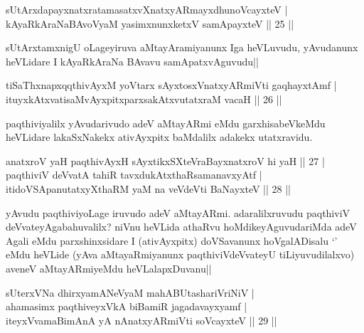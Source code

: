 
\begin{shl}
sUtArxdapayxnatxratamasatxvXnatxyARmayxdhunoVcayxteV |\\
kAyaRkAraNaBAvoV\s yaM yasimxnunxketxV samApayxteV \hfill || 25 ||
\end{shl}

\begin{artha}
sUtArxtamxnigU oLageyiruva aMtayAramiyanunx Iga heVLuvudu, yAvudanunx heVLidare I kAyaRkAraNa BAvavu samApatxvAguvudu||
\end{artha}


\begin{shl}
tiSaThxnapxqqthivAyxM yoV\s tarx sAyxtosxV\s natxyARmiVti  gaqhayxtAmf |\\
ituyxkAtxvatisaMvAyxpitxparxsakAtxvutatxraM vacaH \hfill || 26 ||
\end{shl}

\begin{artha}
paqthiviyalilx yAvudarivudo adeV aMtayARmi eMdu garxhisabeVkeMdu heVLidare lakaSxNakekx ativAyxpitx baMdalilx adakekx utatxravidu.
\end{artha}


\begin{shl}
anatxroV yaH paqthivAyxH sAyxtikxSXteVraBayxnatxroV hi yaH \hfill || 27 |\\
paqthiviV deVvatA tahiR tavxdukAtxthaRsamanavxyAtf |\\
itidoVSApanutatxyXthaRM yaM na veVdeVti BaNayxteV \hfill || 28 ||
\end{shl}

\begin{artha}
yAvudu paqthiviyoLage iruvudo adeV aMtayARmi. adaralilxruvudu paqthiviV deVvateyAgabahuvalilx? niVnu heVLida athaRvu hoMdikeyAguvudariMda adeV Agali eMdu parxshinxsidare I (ativAyxpitx) doVSavanunx hoVgalADisalu `\stext ' eMdu heVLide (yAva aMtayaRmiyanunx paqthiviVdeVvateyU tiLiyuvudilalxvo) aveneV aMtayARmiyeMdu heVLalapxDuvanu||
\end{artha}

\begin{shl}
sUterxVNa dhirxyamANeVyaM mahABUtashariVriNiV |\\
ahamasimx paqthiveyxVkA biBamiR jagadavayxyamf  |\\ 
iteyxVvamaBimAnA yA nAnatxyARmiVti soVcayxteV \hfill || 29 ||
\end{shl}


